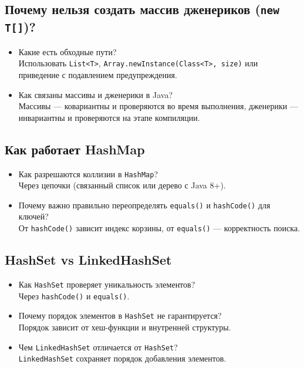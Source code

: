 \documentclass[a4paper,14pt]{article}
\begin{document}
\subsection{Почему нельзя создать массив дженериков (\texttt{new T[]})?}

\begin{itemize}
\item Какие есть обходные пути? \\
Использовать \texttt{List<T>}, \texttt{Array.newInstance(Class<T>, size)} или приведение с подавлением предупреждения.


\item Как связаны массивы и дженерики в Java? \\
Массивы — ковариантны и проверяются во время выполнения, дженерики — инвариантны и проверяются на этапе компиляции.


\end{itemize}

\subsection{Как работает HashMap}

\begin{itemize}
\item Как разрешаются коллизии в \texttt{HashMap}? \\
Через цепочки (связанный список или дерево с Java 8+).


\item Почему важно правильно переопределять \texttt{equals()} и \texttt{hashCode()} для ключей? \\
От \texttt{hashCode()} зависит индекс корзины, от \texttt{equals()} — корректность поиска.


\end{itemize}

\subsection{HashSet vs LinkedHashSet}

\begin{itemize}
\item Как \texttt{HashSet} проверяет уникальность элементов? \\
Через \texttt{hashCode()} и \texttt{equals()}.


\item Почему порядок элементов в \texttt{HashSet} не гарантируется? \\
Порядок зависит от хеш-функции и внутренней структуры.

\item Чем \texttt{LinkedHashSet} отличается от \texttt{HashSet}? \\
\texttt{LinkedHashSet} сохраняет порядок добавления элементов.


\end{itemize}
\end{document}
